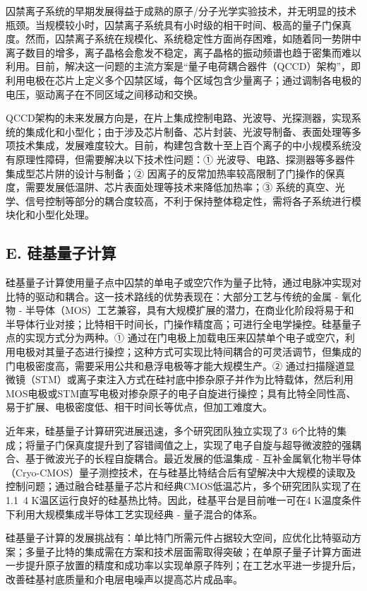 \documentclass[aps,prl,twocolumn,groupedaddress]{revtex4-2}
\begin{document}
囚禁离子系统的早期发展得益于成熟的原子/分子光学实验技术，并无明显的技术瓶颈。当规模较小时，囚禁离子系统具有小时级的相干时间、极高的量子门保真度。然而，囚禁离子系统在规模化、系统稳定性方面尚存困难，如随着同一势阱中离子数目的增多，离子晶格会愈发不稳定，离子晶格的振动频谱也趋于密集而难以利用。目前，解决这一问题的主流方案是“量子电荷耦合器件（QCCD）架构”，即利用电极在芯片上定义多个囚禁区域，每个区域包含少量离子；通过调制各电极的电压，驱动离子在不同区域之间移动和交换。

QCCD架构的未来发展方向是，在片上集成控制电路、光波导、光探测器，实现系统的集成化和小型化；由于涉及芯片制备、芯片封装、光波导制备、表面处理等多项技术集成，发展难度较大。目前，构建包含数十至上百个离子的中小规模系统没有原理性障碍，但需要解决以下技术性问题：① 光波导、电路、探测器等多器件集成型芯片阱的设计与制备；② 因离子的反常加热率较高限制了门操作的保真度，需要发展低温阱、芯片表面处理等技术来降低加热率；③ 系统的真空、光学、信号控制等部分的耦合度较高，不利于保持整体稳定性，需将各子系统进行模块化和小型化处理。

\subsection{E. 硅基量子计算}

硅基量子计算使用量子点中囚禁的单电子或空穴作为量子比特，通过电脉冲实现对比特的驱动和耦合。这一技术路线的优势表现在：大部分工艺与传统的金属 - 氧化物 - 半导体（MOS）工艺兼容，具有大规模扩展的潜力，在商业化阶段将易于和半导体行业对接；比特相干时间长，门操作精度高；可进行全电学操控。硅基量子点的实现方式分为两种。① 通过在门电极上加载电压来囚禁单个电子或空穴，利用电极对其量子态进行操控；这种方式可实现比特间耦合的可灵活调节，但集成的门电极密度高，需要采用公共和悬浮电极等才能大规模生产。② 通过扫描隧道显微镜（STM）或离子束注入方式在硅衬底中掺杂原子并作为比特载体，然后利用MOS电极或STM直写电极对掺杂原子的电子自旋进行操控；具有比特全同性高、易于扩展、电极密度低、相干时间长等优点，但加工难度大。

近年来，硅基量子计算研究进展迅速，多个研究团队独立实现了3~6个比特的集成；将量子门保真度提升到了容错阈值之上，实现了电子自旋与超导微波腔的强耦合、基于微波光子的长程自旋耦合。最近发展的低温集成 - 互补金属氧化物半导体（Cryo-CMOS）量子测控技术，在与硅基比特结合后有望解决中大规模的读取及控制问题；通过融合硅基量子芯片和经典CMOS低温芯片，多个研究团队实现了在1.1~4 K温区运行良好的硅基热比特。因此，硅基平台是目前唯一可在4 K温度条件下利用大规模集成半导体工艺实现经典 - 量子混合的体系。

硅基量子计算的发展挑战有：单比特门所需元件占据较大空间，应优化比特驱动方案；多量子比特的集成需在方案和技术层面需取得突破；在单原子量子计算方面进一步提升原子放置的精度和成功率以实现单原子阵列；在工艺水平进一步提升后，改善硅基衬底质量和介电层电噪声以提高芯片成品率。
\end{document}
